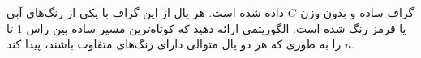 گراف ساده و بدون وزن $G$ داده شده است. هر یال از این گراف با یکی از رنگ‌های آبی یا قرمز رنگ شده است. الگوریتمی ارائه دهید که کوتاه‌ترین مسیر ساده بین راس 1 تا $n$ را به طوری که هر دو یال متوالی دارای رنگ‌های متفاوت باشند، پیدا کند.
